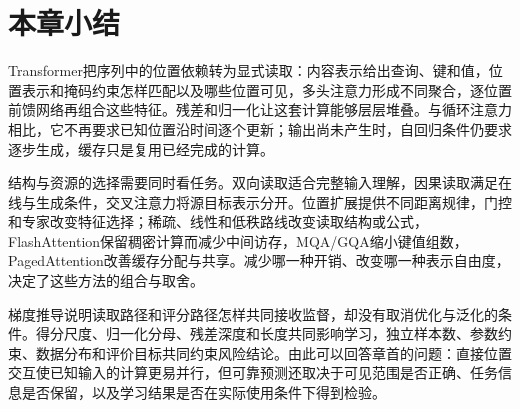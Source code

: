 \section{本章小结}
\label{sec:transformer-summary}

Transformer把序列中的位置依赖转为显式读取：内容表示给出查询、键和值，位置表示和掩码约束怎样匹配以及哪些位置可见，多头注意力形成不同聚合，逐位置前馈网络再组合这些特征。残差和归一化让这套计算能够层层堆叠。与循环注意力相比，它不再要求已知位置沿时间逐个更新；输出尚未产生时，自回归条件仍要求逐步生成，缓存只是复用已经完成的计算。

结构与资源的选择需要同时看任务。双向读取适合完整输入理解，因果读取满足在线与生成条件，交叉注意力将源目标表示分开。位置扩展提供不同距离规律，门控和专家改变特征选择；稀疏、线性和低秩路线改变读取结构或公式，FlashAttention保留稠密计算而减少中间访存，MQA/GQA缩小键值组数，PagedAttention改善缓存分配与共享。减少哪一种开销、改变哪一种表示自由度，决定了这些方法的组合与取舍。

梯度推导说明读取路径和评分路径怎样共同接收监督，却没有取消优化与泛化的条件。得分尺度、归一化分母、残差深度和长度共同影响学习，独立样本数、参数约束、数据分布和评价目标共同约束风险结论。由此可以回答章首的问题：直接位置交互使已知输入的计算更易并行，但可靠预测还取决于可见范围是否正确、任务信息是否保留，以及学习结果是否在实际使用条件下得到检验。
